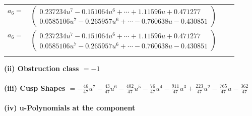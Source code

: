 \documentclass[1p]{elsarticle_modified}
\theoremstyle{definition}
\begin{document}
\begin{tabular}{m{7pt} m{180pt} m{7pt} m{180pt} }
\flushright $a_{6}=$&$\begin{pmatrix}0.237234 u^{7}-0.151064 u^{6}+\cdots+1.11596 u+0.471277\\0.0585106 u^{7}-0.265957 u^{6}+\cdots-0.760638 u-0.430851\end{pmatrix}$\\ \flushright $a_{6}=$&$\begin{pmatrix}0.237234 u^{7}-0.151064 u^{6}+\cdots+1.11596 u+0.471277\\0.0585106 u^{7}-0.265957 u^{6}+\cdots-0.760638 u-0.430851\end{pmatrix}$\\&\end{tabular}
\flushleft \textbf{(ii) Obstruction class $= -1$}\\~\\
\flushleft \textbf{(iii) Cusp Shapes $= -\frac{46}{47} u^7-\frac{43}{47} u^6-\frac{402}{47} u^5-\frac{76}{47} u^4-\frac{911}{47} u^3+\frac{223}{47} u^2-\frac{765}{47} u-\frac{362}{47}$}\\~\\
\newpage\renewcommand{\arraystretch}{1}
\flushleft \textbf{(iv) u-Polynomials at the component}\newline \\
\end{document}
